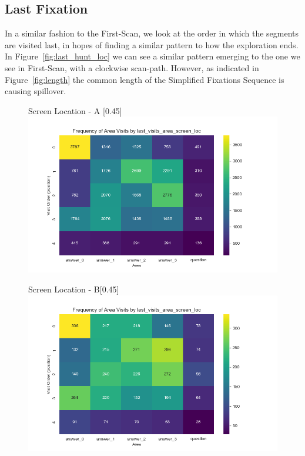 \documentclass[manuscript,review,anonymous]{acmart}
\begin{document}
    
    \subsection{Last Fixation}

    In a similar fashion to the First-Scan, we look at the order in which the segments are visited last, in hopes of finding a similar pattern to how the exploration ends. In Figure~\ref{fig:last_hunt_loc} we can see a similar pattern emerging to the one we see in First-Scan, with a clockwise scan-path. However, as indicated in Figure~\ref{fig:length} the common length of the Simplified Fixations Sequence is causing spillover. 

    \begin{figure}[htbp]
      \centering
      \begin{subcaptionbox}{Screen Location - A \label{fig:aaa}}[0.45\textwidth]
        {\centering\includegraphics[width=\linewidth]{plots/visits/matrix__last_visits_area_screen_loc_hunters_A.png}}
      \end{subcaptionbox}
      \hfill
      \begin{subcaptionbox}{Screen Location - B\label{fig:bbb}}[0.45\textwidth]
        {\centering\includegraphics[width=\linewidth]{plots/visits/matrix__last_visits_area_screen_loc_hunters_B.png}}
      \end{subcaptionbox}
      

\end{figure}
\end{document}
